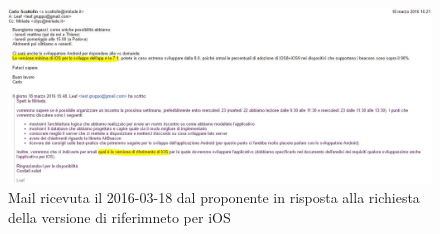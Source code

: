 \documentclass[../RiunioneInterna16-02-19.tex]{subfiles}
\begin{document}
	\begin{figure}
		\includegraphics[width=\textwidth]{img/mail}
		\caption{Mail ricevuta il 2016-03-18 dal proponente in risposta alla richiesta della versione di riferimneto per iOS }		
		\label{mail}
	\end{figure}
	\hfill
\end{document}
